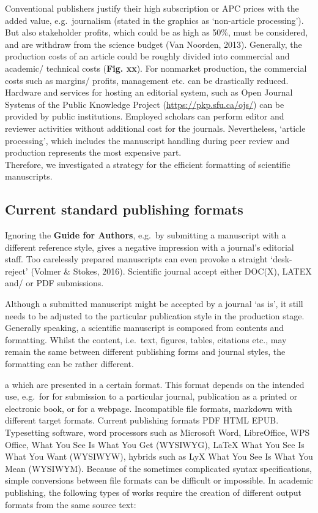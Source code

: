\documentclass[10pt,fleqn]{wlpeerj}
\begin{document}
Conventional
publishers
justify
their
high
subscription
or
APC
prices
with
the
added
value,
e.g.~journalism
(stated
in
the
graphics
as
`non-article
processing').
But
also
stakeholder
profits,
which
could
be as
high
as
50\%,
must
be
considered,
and
are
withdraw
from
the
science
budget
(Van
Noorden,
2013).
Generally,
the
production
costs
of an
article
could
be
roughly
divided
into
commercial
and
academic/
technical
costs
(\textbf{Fig.
xx}).
For
nonmarket
production,
the
commercial
costs
such
as
margins/
profits,
management
etc.
can
be
drastically
reduced.
Hardware
and
services
for
hosting
an
editorial
system,
such
as
Open
Journal
Systems
of
the
Public
Knowledge
Project
(\url{https://pkp.sfu.ca/ojs/})
can
be
provided
by
public
institutions.
Employed
scholars
can
perform
editor
and
reviewer
activities
without
additional
cost
for
the
journals.
Nevertheless,
`article
processing',
which
includes
the
manuscript
handling
during
peer
review
and
production
represents
the
most
expensive
part.\\
Therefore,
we
investigated
a
strategy
for
the
efficient
formatting
of
scientific
manuscripts.

\subsection{Current
standard
publishing
formats}\label{current-standard-publishing-formats}

Ignoring
the
\textbf{Guide
for
Authors},
e.g.~by
submitting
a
manuscript
with
a
different
reference
style,
gives
a
negative
impression
with
a
journal's
editorial
staff.
Too
carelessly
prepared
manuscripts
can
even
provoke
a
straight
`desk-reject'
(Volmer
\&
Stokes,
2016).
Scientific
journal
accept
either
DOC(X),
LATEX
and/
or
PDF
submissions.

Although
a
submitted
manuscript
might
be
accepted
by a
journal
`as
is',
it
still
needs
to be
adjusted
to
the
particular
publication
style
in
the
production
stage.
Generally
speaking,
a
scientific
manuscript
is
composed
from
contents
and
formatting.
Whilst
the
content,
i.e.~text,
figures,
tables,
citations
etc.,
may
remain
the
same
between
different
publishing
forms
and
journal
styles,
the
formatting
can
be
rather
different.

a
which
are
presented
in a
certain
format.
This
format
depends
on
the
intended
use,
e.g.~for
for
submission
to a
particular
journal,
publication
as a
printed
or
electronic
book,
or
for a
webpage.
Incompatible
file
formats,
markdown
with
different
target
formats.
Current
publishing
formats
PDF
HTML
EPUB.
Typesetting
software,
word
processors
such
as
Microsoft
Word,
LibreOffice,
WPS
Office,
What
You
See
Is
What
You
Get
(WYSIWYG),
LaTeX
What
You
See
Is
What
You
Want
(WYSIWYW),
hybrids
such
as
LyX
What
You
See
Is
What
You
Mean
(WYSIWYM).
Because
of
the
sometimes
complicated
syntax
specifications,
simple
conversions
between
file
formats
can
be
difficult
or
impossible.
In
academic
publishing,
the
following
types
of
works
require
the
creation
of
different
output
formats
from
the
same
source
text:
\end{document}
